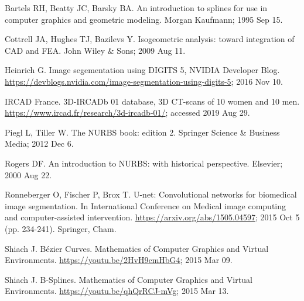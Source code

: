
\begin{thebibliography}{2}

 Bartels RH, Beatty JC, Barsky BA. An introduction to splines for use in computer graphics and geometric modeling. Morgan Kaufmann; 1995 Sep 15.

 Cottrell JA, Hughes TJ, Bazilevs Y. Isogeometric analysis: toward integration of CAD and FEA. John Wiley \& Sons; 2009 Aug 11.

 Heinrich G.  Image segementation using DIGITS 5, NVIDIA Developer Blog.  \url{https://devblogs.nvidia.com/image-segmentation-using-digits-5}; 2016 Nov 10.

IRCAD France.  3D-IRCADb 01 database, 3D CT-scans of 10 women and 10 men. \url{https://www.ircad.fr/research/3d-ircadb-01/}; accessed 2019 Aug 29.

 Piegl L, Tiller W. The NURBS book: edition 2. Springer Science \& Business Media; 2012 Dec 6.

 Rogers DF. An introduction to NURBS: with historical perspective. Elsevier; 2000 Aug 22.

 Ronneberger O, Fischer P, Brox T. U-net: Convolutional networks for biomedical image segmentation. In International Conference on Medical image computing and computer-assisted intervention. \url{https://arxiv.org/abs/1505.04597}; 2015 Oct 5 (pp. 234-241). Springer, Cham.

 Shiach J. B\'ezier Curves.  Mathematics of Computer Graphics and Virtual Environments.  \url{https://youtu.be/2HvH9cmHbG4}; 2015 Mar 09.

 Shiach J. B-Splines.  Mathematics of Computer Graphics and Virtual Environments.  \url{https://youtu.be/qhQrRCJ-mVg}; 2015 Mar 13.

\end{thebibliography}

